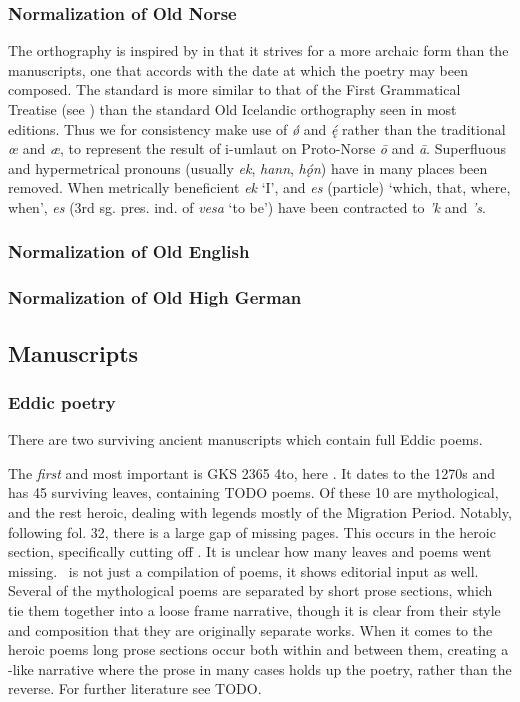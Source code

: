     \subsubsection{Normalization of Old Norse}
    The orthography is inspired by \textcite{FinnurEdda} in that it strives for a more archaic form than the manuscripts, one that accords with the date at which the poetry may been composed. The standard is more similar to that of the First Grammatical Treatise (see \parencite{FGTHaugen}) than the standard Old Icelandic orthography seen in most editions. Thus we for consistency make use of \emph{ǿ} and \emph{ę́} rather than the traditional \emph{œ} and \emph{æ}, to represent the result of i-umlaut on Proto-Norse \emph{ō} and \emph{ā}.
    Superfluous and hypermetrical pronouns (usually \emph{ek}, \emph{hann}, \emph{hǫ́n}) have in many places been removed. When metrically beneficient \emph{ek} ‘I’, and \emph{es} (particle) ‘which, that, where, when’, \emph{es} (3rd sg. pres. ind. of \emph{vesa} ‘to be’) have been contracted to \emph{’k} and \emph{’s}.

    \subsubsection{Normalization of Old English}

    \subsubsection{Normalization of Old High German}

  \subsection{Manuscripts}

    \subsubsection{Eddic poetry}
    There are two surviving ancient manuscripts which contain full Eddic poems.

    The \emph{first} and most important is GKS 2365 4to, here \Regius. It dates to the 1270s and has 45 surviving leaves, containing TODO poems. Of these 10 are mythological, and the rest heroic, dealing with legends mostly of the Migration Period. Notably, following fol. 32, there is a large gap of missing pages. This occurs in the heroic section, specifically cutting off \Sigrdrifumal. It is unclear how many leaves and poems went missing.
    \Regius\ is not just a compilation of poems, it shows editorial input as well. Several of the mythological poems are separated by short prose sections, which tie them together into a loose frame narrative, though it is clear from their style and composition that they are originally separate works. When it comes to the heroic poems long prose sections occur both within and between them, creating a -like narrative where the prose in many cases holds up the poetry, rather than the reverse. For further literature see TODO.

